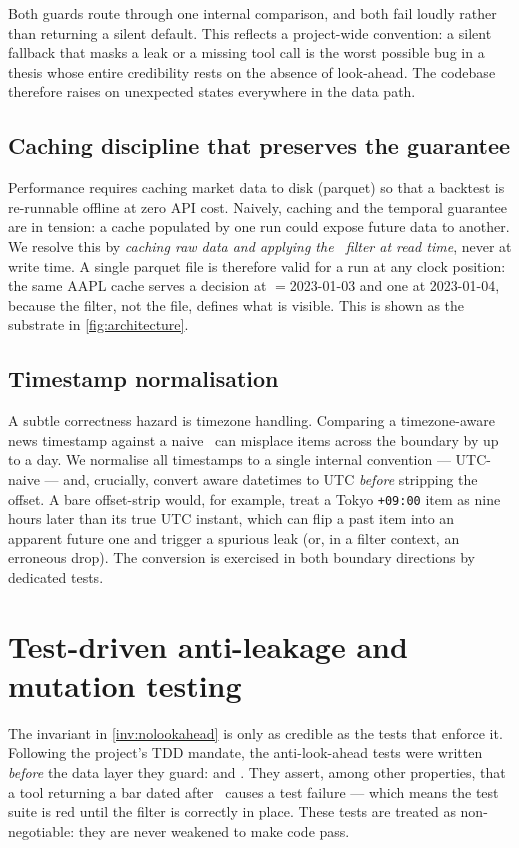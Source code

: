 Both guards route through one internal comparison, and both fail loudly rather than
returning a silent default. This reflects a project-wide convention: a silent fallback that
masks a leak or a missing tool call is the worst possible bug in a thesis whose entire
credibility rests on the absence of look-ahead. The codebase therefore raises on unexpected
states everywhere in the data path.

\subsection{Caching discipline that preserves the guarantee}

Performance requires caching market data to disk (parquet) so that a backtest is
re-runnable offline at zero API cost. Naively, caching and the temporal guarantee are in
tension: a cache populated by one run could expose future data to another. We resolve this
by \emph{caching raw data and applying the \tnow\ filter at read time}, never at write time.
A single parquet file is therefore valid for a run at any clock position: the same AAPL
cache serves a decision at \tnow${}={}$2023-01-03 and one at 2023-01-04, because the filter,
not the file, defines what is visible. This is shown as the substrate in
\cref{fig:architecture}.

\subsection{Timestamp normalisation}

A subtle correctness hazard is timezone handling. Comparing a timezone-aware news timestamp
against a naive \tnow\ can misplace items across the boundary by up to a day. We normalise
all timestamps to a single internal convention --- UTC-naive --- and, crucially, convert
aware datetimes to UTC \emph{before} stripping the offset. A bare offset-strip would, for
example, treat a Tokyo \texttt{+09:00} item as nine hours later than its true UTC instant,
which can flip a past item into an apparent future one and trigger a spurious leak (or, in a
filter context, an erroneous drop). The conversion is exercised in both boundary directions
by dedicated tests.

\section{Test-driven anti-leakage and mutation testing}
\label{sec:tdd}

The invariant in \cref{inv:nolookahead} is only as credible as the tests that enforce it.
Following the project's TDD mandate, the anti-look-ahead tests were written \emph{before}
the data layer they guard:  and
. They assert, among other properties, that a
tool returning a bar dated after \tnow\ causes a test failure --- which means the test
suite is red until the filter is correctly in place. These tests are treated as
non-negotiable: they are never weakened to make code pass.


